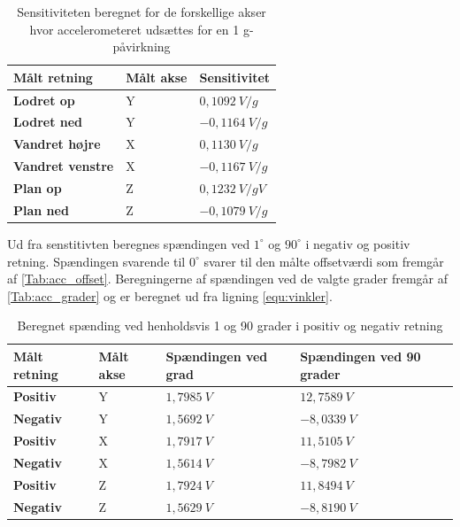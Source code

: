 \begin{table}[H]
	\centering
	\begin{tabular}{|l|l|l|}
	\textbf{Målt retning} & \textbf{Målt akse} & \textbf{Sensitivitet} \\ \hline
    \textbf{Lodret op} 		& Y		& $0,1092~V/g$ 	\\ \hline
    \textbf{Lodret ned}		& Y 		& $-0,1164~V/g$ 	\\ \hline
    \textbf{Vandret højre} 	& X 		& $0,1130~V/g$     \\ \hline     
    \textbf{Vandret venstre}	& X 		& $-0,1167~V/g$ 	\\ \hline
    \textbf{Plan op} 		& Z 		& $0,1232~V/gV$    	\\ \hline		
    \textbf{Plan ned} 		& Z 		& $-0,1079~V/g$		\\ \hline
	\end{tabular}
	\caption{Sensitiviteten beregnet for de forskellige akser hvor accelerometeret udsættes for en 1 g-påvirkning}
	\label{Tab:acc_offset}
\end{table}

Ud fra senstitivten beregnes spændingen ved $1^{\circ}$ og $90^{\circ}$ i negativ og positiv retning. Spændingen svarende til $0^{\circ}$ svarer til den målte offsetværdi som fremgår af \autoref{Tab:acc_offset}. Beregningerne af spændingen ved de valgte grader fremgår af \autoref{Tab:acc_grader} og er beregnet ud fra ligning \autoref{equ:vinkler}.

 \begin{table}[H]
	\centering
	\begin{tabular}{|l|l|l|l|}
	\textbf{Målt retning} & \textbf{Målt akse} & \textbf{Spændingen ved grad} & \textbf{Spændingen ved 90 grader} \\ \hline
    \textbf{Positiv} 	& Y		& $1,7985~V$   	&	$12,7589~V$\\ \hline
    \textbf{Negativ}		& Y		& $1,5692~V$  	&	$-8,0339~V$\\ \hline
    \textbf{Positiv} 	& X 		& $1,7917~V$   	& 	$11,5105~V$ \\ \hline     
    \textbf{Negativ}		& X 		& $1,5614~V$		&	$-8,7982~V$\\ \hline
    \textbf{Positiv} 	& Z 		& $1,7924~V$   	& 	$11,8494~V$	\\ \hline		
    \textbf{Negativ} 	& Z 		& $1,5629~V$		&	$-8,8190~V$ \\ \hline
	\end{tabular}
	\caption{Beregnet spænding ved henholdsvis 1 og 90 grader i positiv og negativ retning}
	\label{Tab:acc_grader}
\end{table}





